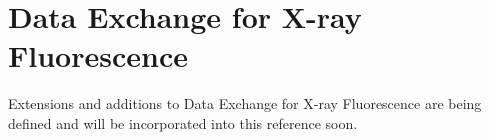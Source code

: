 \documentclass[usletter,11pt]{article}
\begin{document}
\section{Data Exchange for X-ray Fluorescence}

Extensions and additions to Data Exchange for X-ray Fluorescence are being defined
and will be incorporated into this reference soon.

\newpage




\newpage



\newpage

\listoffigures
\end{document}
